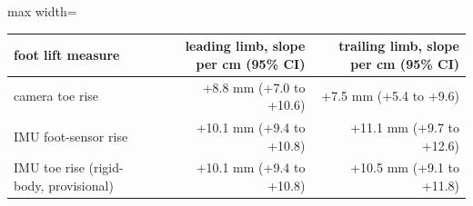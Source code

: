 \begin{adjustbox}{max width=\textwidth}
{\footnotesize
\begin{tabular}{lrr}
\toprule
\textbf{foot lift measure} & \textbf{leading limb, slope per cm (95\% CI)} & \textbf{trailing limb, slope per cm (95\% CI)} \\
\midrule
camera toe rise & +8.8 mm (+7.0 to +10.6) & +7.5 mm (+5.4 to +9.6) \\
IMU foot-sensor rise & +10.1 mm (+9.4 to +10.8) & +11.1 mm (+9.7 to +12.6) \\
IMU toe rise (rigid-body, provisional) & +10.1 mm (+9.4 to +10.8) & +10.5 mm (+9.1 to +11.8) \\
\bottomrule
\end{tabular}
}
\end{adjustbox}
